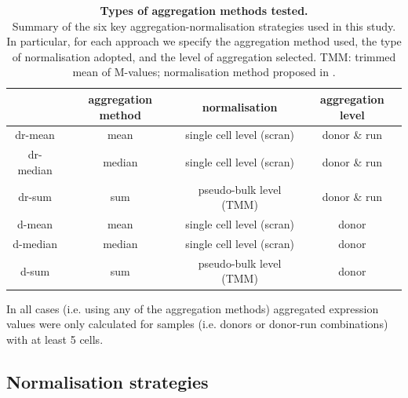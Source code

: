 \begin{table}[h]
    \centering
    \begin{tabular}{c|c c c}
    &       aggregation method & normalisation & aggregation level  \\
    \hline
    dr-mean    & mean   & single cell level (scran) &  donor \& run \\
    dr-median  & median & single cell level (scran) &  donor \& run \\
    dr-sum     & sum    & pseudo-bulk level (TMM) &  donor \& run \\
    d-mean     & mean   & single cell level (scran) &  donor \\
    d-median   & median & single cell level (scran) &  donor \\
    d-sum      & sum    & pseudo-bulk level (TMM) &  donor \\
    \end{tabular}
    \caption[Aggregation methods used]{\textbf{Types of aggregation methods tested.}\\
    Summary of the six key aggregation-normalisation strategies used in this study. 
    In particular, for each approach we specify the aggregation method used, the type of normalisation adopted, and the level of aggregation selected.
    TMM: trimmed mean of M-values; normalisation method proposed in \cite{robinson2010scaling}.}
    \label{tab:sc_eqtl_aggregations}
\end{table}

In all cases (i.e. using any of the aggregation methods) aggregated expression values were only calculated for samples (i.e. donors or donor-run combinations) with at least 5 cells.

\newpage

\subsection{Normalisation strategies}

